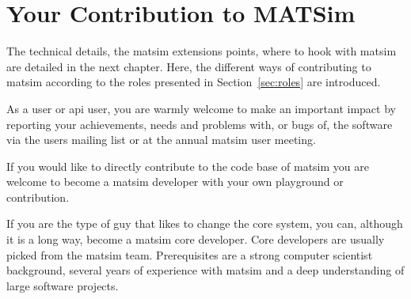 \section{Your Contribution to MATSim}
\label{sec:yourcontribution}
The technical details, \ie the \gls{matsim} extensions points, where to hook with \gls{matsim} are detailed in the next chapter. Here, the different ways of contributing to \gls{matsim} according to the roles presented in Section~\ref{sec:roles} are introduced.

As a user or \gls{api} user, you are warmly welcome to make an important impact by reporting your achievements, needs and problems with, or bugs of, the software via the users mailing list or at the annual \gls{matsim} user meeting. 

If you would like to directly contribute to the code base of \gls{matsim} you are welcome to become a \gls{matsim} developer with your own playground or \gls{contribution}.

If you are the type of guy that likes to change the core system, you can, although it is a long way, become a \gls{matsim} core developer. Core developers are usually picked from the \gls{matsim} team. Prerequisites are a strong computer scientist background, several years of experience with \gls{matsim} and a deep understanding of large software projects.

